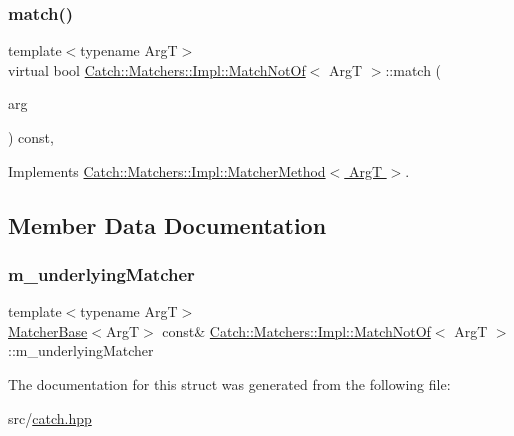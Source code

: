 \mbox{\label{struct_catch_1_1_matchers_1_1_impl_1_1_match_not_of_a1b9ad6566e4ab0f292d2903f557307cc}} 
\subsubsection{\texorpdfstring{match()}{match()}}
{\footnotesize\ttfamily template$<$typename ArgT$>$ \\
virtual bool \hyperlink{struct_catch_1_1_matchers_1_1_impl_1_1_match_not_of}{Catch\+::\+Matchers\+::\+Impl\+::\+Match\+Not\+Of}$<$ ArgT $>$\+::match (\begin{DoxyParamCaption}\item[{ArgT const \&}]{arg }\end{DoxyParamCaption}) const\hspace{0.3cm}{\ttfamily [inline]}, {\ttfamily [virtual]}}



Implements \hyperlink{struct_catch_1_1_matchers_1_1_impl_1_1_matcher_method_ae0920ff9e817acf08e1bb0cbcb044e30}{Catch\+::\+Matchers\+::\+Impl\+::\+Matcher\+Method$<$ Arg\+T $>$}.



\subsection{Member Data Documentation}
\mbox{\label{struct_catch_1_1_matchers_1_1_impl_1_1_match_not_of_af7ac67f112b0e93796b048a47329aad4}} 
\subsubsection{\texorpdfstring{m\+\_\+underlying\+Matcher}{m\_underlyingMatcher}}
{\footnotesize\ttfamily template$<$typename ArgT$>$ \\
\hyperlink{struct_catch_1_1_matchers_1_1_impl_1_1_matcher_base}{Matcher\+Base}$<$ArgT$>$ const\& \hyperlink{struct_catch_1_1_matchers_1_1_impl_1_1_match_not_of}{Catch\+::\+Matchers\+::\+Impl\+::\+Match\+Not\+Of}$<$ ArgT $>$\+::m\+\_\+underlying\+Matcher}



The documentation for this struct was generated from the following file\+:\begin{DoxyCompactItemize}
\item 
src/\hyperlink{catch_8hpp}{catch.\+hpp}\end{DoxyCompactItemize}
